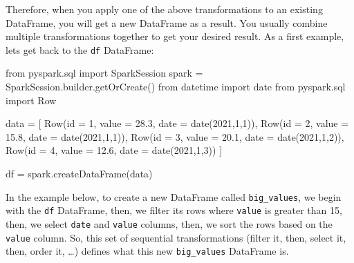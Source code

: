 \documentclass[
  11pt,
  letterpaper,
  DIV=11,
  numbers=noendperiod]{scrreprt}
\newenvironment{Shaded}{\begin{snugshade}}{\end{snugshade}}
\newcommand{\BuiltInTok}[1]{\textcolor[rgb]{0.00,0.23,0.31}{#1}}
\newcommand{\DecValTok}[1]{\textcolor[rgb]{0.68,0.00,0.00}{#1}}
\newcommand{\FloatTok}[1]{\textcolor[rgb]{0.68,0.00,0.00}{#1}}
\newcommand{\ImportTok}[1]{\textcolor[rgb]{0.00,0.46,0.62}{#1}}
\newcommand{\NormalTok}[1]{\textcolor[rgb]{0.00,0.23,0.31}{#1}}
\newcommand{\OperatorTok}[1]{\textcolor[rgb]{0.37,0.37,0.37}{#1}}
\begin{document}
Therefore, when you apply one of the above transformations to an
existing DataFrame, you will get a new DataFrame as a result. You
usually combine multiple transformations together to get your desired
result. As a first example, lets get back to the \texttt{df} DataFrame:

\begin{Shaded}
\begin{Highlighting}[]
\ImportTok{from}\NormalTok{ pyspark.sql }\ImportTok{import}\NormalTok{ SparkSession}
\NormalTok{spark }\OperatorTok{=}\NormalTok{ SparkSession.builder.getOrCreate()}
\ImportTok{from}\NormalTok{ datetime }\ImportTok{import}\NormalTok{ date}
\ImportTok{from}\NormalTok{ pyspark.sql }\ImportTok{import}\NormalTok{ Row}

\NormalTok{data }\OperatorTok{=}\NormalTok{ [}
\NormalTok{  Row(}\BuiltInTok{id} \OperatorTok{=} \DecValTok{1}\NormalTok{, value }\OperatorTok{=} \FloatTok{28.3}\NormalTok{, date }\OperatorTok{=}\NormalTok{ date(}\DecValTok{2021}\NormalTok{,}\DecValTok{1}\NormalTok{,}\DecValTok{1}\NormalTok{)),}
\NormalTok{  Row(}\BuiltInTok{id} \OperatorTok{=} \DecValTok{2}\NormalTok{, value }\OperatorTok{=} \FloatTok{15.8}\NormalTok{, date }\OperatorTok{=}\NormalTok{ date(}\DecValTok{2021}\NormalTok{,}\DecValTok{1}\NormalTok{,}\DecValTok{1}\NormalTok{)),}
\NormalTok{  Row(}\BuiltInTok{id} \OperatorTok{=} \DecValTok{3}\NormalTok{, value }\OperatorTok{=} \FloatTok{20.1}\NormalTok{, date }\OperatorTok{=}\NormalTok{ date(}\DecValTok{2021}\NormalTok{,}\DecValTok{1}\NormalTok{,}\DecValTok{2}\NormalTok{)),}
\NormalTok{  Row(}\BuiltInTok{id} \OperatorTok{=} \DecValTok{4}\NormalTok{, value }\OperatorTok{=} \FloatTok{12.6}\NormalTok{, date }\OperatorTok{=}\NormalTok{ date(}\DecValTok{2021}\NormalTok{,}\DecValTok{1}\NormalTok{,}\DecValTok{3}\NormalTok{))}
\NormalTok{]}

\NormalTok{df }\OperatorTok{=}\NormalTok{ spark.createDataFrame(data)}
\end{Highlighting}
\end{Shaded}

In the example below, to create a new DataFrame called
\texttt{big\_values}, we begin with the \texttt{df} DataFrame, then, we
filter its rows where \texttt{value} is greater than 15, then, we select
\texttt{date} and \texttt{value} columns, then, we sort the rows based
on the \texttt{value} column. So, this set of sequential transformations
(filter it, then, select it, then, order it, \ldots) defines what this
new \texttt{big\_values} DataFrame is.
\end{document}

